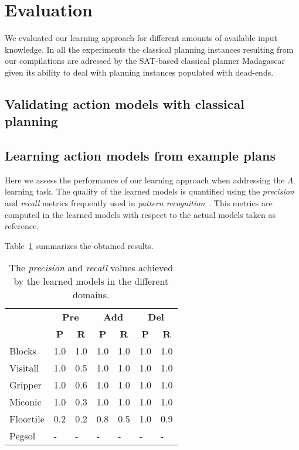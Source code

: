 \documentclass[letterpaper]{article} %
\begin{document}
\section{Evaluation}
We evaluated our learning approach for different amounts of available input knowledge. In all the experiments the classical planning instances resulting from our compilations are adressed by the SAT-based classical planner {\sc Madagascar}~\cite{rintanen2014madagascar} given its ability to deal with planning instances populated with dead-ends.


\subsection{Validating action models with classical planning}


\subsection{Learning action models from example plans}
Here we assess the performance of our learning approach when addressing the $\Lambda$ learning task. The quality of the learned models is quantified using the {\em precision} and {\em recall} metrics frequently used in {\em pattern recognition}~\cite{davis2006relationship}. This metrics are computed in the learned models with respect to the actual models taken as reference. 

Table~\ref{tab:results_plans} summarizes the obtained results.

\begin{table}[hbt!]
	\begin{center}
		\begin{tabular}{l|l|l|l|l|l|l|}
			 & \multicolumn{2}{|c|}{\bf Pre} & \multicolumn{2}{|c|}{\bf Add} & \multicolumn{2}{|c|}{\bf Del}  \\ \cline{2-7}			 
			  & \multicolumn{1}{|c|}{\bf P} & \multicolumn{1}{|c|}{\bf R} & \multicolumn{1}{|c|}{\bf P} & \multicolumn{1}{|c|}{\bf R} & \multicolumn{1}{|c|}{\bf P} & \multicolumn{1}{|c|}{\bf R} \\
			\hline
			Blocks & 1.0 & 1.0 & 1.0 & 1.0 & 1.0 & 1.0 \\
			Visitall & 1.0 & 0.5 & 1.0 & 1.0 & 1.0 & 1.0 \\
			Gripper & 1.0 & 0.6 & 1.0 & 1.0 & 1.0 & 1.0 \\
			Miconic & 1.0 & 0.3 & 1.0 & 1.0 & 1.0 & 1.0 \\
			Floortile & 0.2 & 0.2 & 0.8 & 0.5 & 1.0 & 0.9 \\
			Pegsol & - & - & - & - & - & - \\
		\end{tabular}
	\end{center}
\label{tab:results_plans}	        
\caption{The {\em precision} and {\em recall} values achieved by the learned models in the different domains.}
\end{table}
\end{document}
